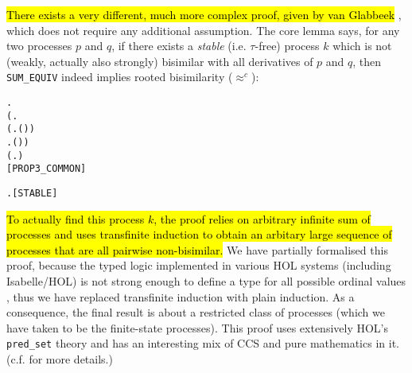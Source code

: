 \hl{There exists a very different, much more complex proof,
given by van Glabbeek} \cite{vanGlabbeek:2005ur}, which does not
require any additional assumption.
The core lemma says, for
any two processes $p$ and $q$, if there exists a \emph{stable} (i.e. $\tau$-free)
 process $k$ which is not (weakly, actually also strongly) bisimilar with
all derivatives of $p$ and $q$, then \texttt{SUM_EQUIV} indeed implies
rooted bisimilarity ($\approx^c$):
\begin{alltt}
\HOLTokenTurnstile{} \HOLSymConst{\HOLTokenForall{}} .
       (\HOLSymConst{\HOLTokenExists{}}.
              \HOLSymConst{\HOLTokenConj{}} (\HOLSymConst{\HOLTokenForall{}} .  \HOLTokenWeakTransBegin{}\HOLTokenWeakTransEnd {} \HOLSymConst{\HOLTokenImp{}} \HOLSymConst{\HOLTokenNeg{}}( \HOLSymConst{\HOLTokenWeakEQ} )) \HOLSymConst{\HOLTokenConj{}}
            \HOLSymConst{\HOLTokenForall{}} .  \HOLTokenWeakTransBegin{}\HOLTokenWeakTransEnd {} \HOLSymConst{\HOLTokenImp{}} \HOLSymConst{\HOLTokenNeg{}}( \HOLSymConst{\HOLTokenWeakEQ} )) \HOLSymConst{\HOLTokenImp{}}
       (\HOLSymConst{\HOLTokenForall{}}.  \HOLSymConst{+}  \HOLSymConst{\HOLTokenWeakEQ}  \HOLSymConst{+} ) \HOLSymConst{\HOLTokenImp{}}
        \HOLSymConst{\HOLTokenObsCongr} \hfill{[PROP3_COMMON]}
\end{alltt}
\begin{alltt}
  \HOLSymConst{\HOLTokenEquiv{}} \HOLSymConst{\HOLTokenForall{}} .  \HOLTokenTransBegin{}\HOLTokenTransEnd {} \HOLSymConst{\HOLTokenImp{}}  \HOLSymConst{\HOLTokenNotEqual{}} \HOLSymConst{\ensuremath{\tau}}\hfill{[STABLE]}
\end{alltt}
\hl{To actually find this process $k$, the proof relies on arbitrary infinite sum of 
processes and uses transfinite induction to obtain
an arbitary large sequence of processes %
 that are all pairwise non-bisimilar.} 
We have partially formalised
this proof, because the typed logic
implemented in various HOL systems (including Isabelle/HOL) is not
strong enough to define a type for all possible ordinal values
\cite{norrish2013ordinals}, thus
we have replaced transfinite induction with plain induction. As a
consequence, the final
result is about a restricted class of processes (which we have taken
to be the finite-state processes). This proof uses extensively HOL's
\texttt{pred_set} theory \cite{melham1992hol} and has an interesting mix
of CCS and pure mathematics in it. (c.f. \cite{Tian:2017wrba} for
more details.)
